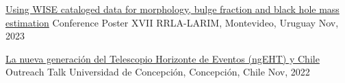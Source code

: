 
\begin{cvhonors}
\iffalse
    \cvhonor
	{Morphology, bulge fraction, and black hole mass estimation using WISE cataloged data: The WISE2MBH algorithm}
	{Academic talk}
	{European Southern Observatory, Munich, Germany}
	{Jan, 2024}

    \cvhonor
	{Morphology, bulge fraction, and black hole mass estimation using WISE cataloged data: The WISE2MBH algorithm}
	{Academic Talk}
	{Max Planck Institute for Radioastronomy, Bonn, Germany}
	{Jan, 2024}
\fi
    \cvhonor
	{\href{https://joacoh.github.io/talks/2023-11-29-talk}{Using WISE cataloged data for morphology, bulge fraction and black hole mass estimation}}
	{Conference Poster}
	{XVII RRLA-LARIM, Montevideo, Uruguay}
	{Nov, 2023}

    \cvhonor
	{\href{https://joacoh.github.io/talks/2022-11-04-talk}{La nueva generación del Telescopio Horizonte de Eventos (ngEHT) y Chile}}
	{Outreach Talk}
	{Universidad de Concepción, Concepción, Chile}
	{Nov, 2022}
 
\end{cvhonors}
